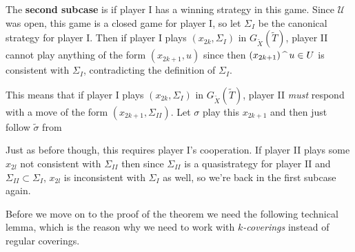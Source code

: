{\qquad The \textbf{second subcase} is if player I has a winning strategy in this game. Since $\mathcal{U}$ was open, this game is a closed game for player I, so let $\Sigma_I$ be the canonical strategy for player I. Then if player I plays $(x_{2k},\Sigma_I)$ in $G_{\tilde X}(\tilde T)$, player II cannot play anything of the form $(x_{2k+1},u)$ since then $(x_{2k+1})\operatorname{\text{\textasciicircum}} u\in U$ is consistent with $\Sigma_I$, contradicting the definition of $\Sigma_I$.

\qquad This means that if player I plays $(x_{2k},\Sigma_I)$ in $G_{\tilde X}(\tilde T)$, player II \textit{must} respond with a move of the form $(x_{2k+1},\Sigma_{II})$. Let $\sigma$ play this $x_{2k+1}$ and then just follow $\tilde\sigma$ from

\qquad Just as before though, this requires player I's cooperation. If player II plays some $x_{2l}$ not consistent with $\Sigma_{II}$ then since $\Sigma_{II}$ is a quasistrategy for player II and $\Sigma_{II}\subset\Sigma_I$, $x_{2l}$ is inconsistent with $\Sigma_I$ as well, so we're back in the first subcase again.
}

Before we move on to the proof of the theorem we need the following technical lemma, which is the reason why we need to work with \textit{$k$-coverings} instead of regular coverings.

